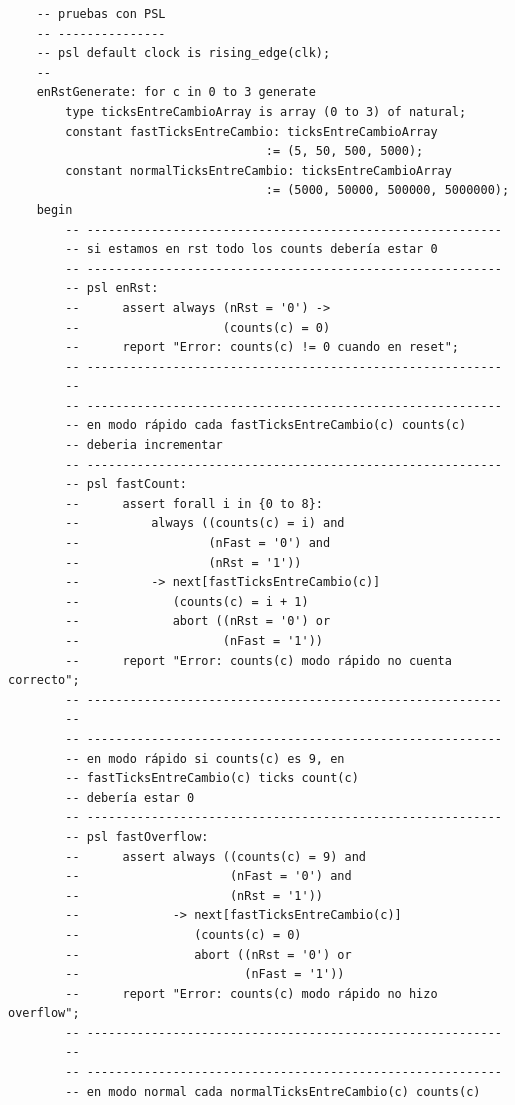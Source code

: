 \documentclass[a4paper]{article}
\begin{document}
\begin{verbatim}
    -- pruebas con PSL
    -- ---------------
    -- psl default clock is rising_edge(clk);
    --
    enRstGenerate: for c in 0 to 3 generate
        type ticksEntreCambioArray is array (0 to 3) of natural;
        constant fastTicksEntreCambio: ticksEntreCambioArray
                                    := (5, 50, 500, 5000);
        constant normalTicksEntreCambio: ticksEntreCambioArray
                                    := (5000, 50000, 500000, 5000000);
    begin
        -- ----------------------------------------------------------
        -- si estamos en rst todo los counts debería estar 0
        -- ----------------------------------------------------------
        -- psl enRst:
        --      assert always (nRst = '0') ->
        --                    (counts(c) = 0)
        --      report "Error: counts(c) != 0 cuando en reset";
        -- ----------------------------------------------------------
        --
        -- ----------------------------------------------------------
        -- en modo rápido cada fastTicksEntreCambio(c) counts(c)
        -- deberia incrementar
        -- ----------------------------------------------------------
        -- psl fastCount:
        --      assert forall i in {0 to 8}:
        --          always ((counts(c) = i) and
        --                  (nFast = '0') and
        --                  (nRst = '1'))
        --          -> next[fastTicksEntreCambio(c)]
        --             (counts(c) = i + 1)
        --             abort ((nRst = '0') or
        --                    (nFast = '1'))
        --      report "Error: counts(c) modo rápido no cuenta correcto";
        -- ----------------------------------------------------------
        --
        -- ----------------------------------------------------------
        -- en modo rápido si counts(c) es 9, en
        -- fastTicksEntreCambio(c) ticks count(c)
        -- debería estar 0
        -- ----------------------------------------------------------
        -- psl fastOverflow:
        --      assert always ((counts(c) = 9) and
        --                     (nFast = '0') and
        --                     (nRst = '1'))
        --             -> next[fastTicksEntreCambio(c)]
        --                (counts(c) = 0)
        --                abort ((nRst = '0') or
        --                       (nFast = '1'))
        --      report "Error: counts(c) modo rápido no hizo overflow";
        -- ----------------------------------------------------------
        --
        -- ----------------------------------------------------------
        -- en modo normal cada normalTicksEntreCambio(c) counts(c)

\end{verbatim}
\end{document}
